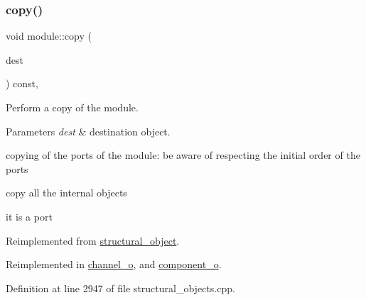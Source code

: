 \subsubsection{\texorpdfstring{copy()}{copy()}}
{\footnotesize\ttfamily void module\+::copy (\begin{DoxyParamCaption}\item[{\hyperlink{structural__objects_8hpp_a8ea5f8cc50ab8f4c31e2751074ff60b2}{structural\+\_\+object\+Ref}}]{dest }\end{DoxyParamCaption}) const\hspace{0.3cm}{\ttfamily [override]}, {\ttfamily [virtual]}}



Perform a copy of the module. 


\begin{DoxyParams}{Parameters}
{\em dest} & destination object. \\
\hline
\end{DoxyParams}
copying of the ports of the module\+: be aware of respecting the initial order of the ports

copy all the internal objects

it is a port 

Reimplemented from \hyperlink{classstructural__object_a6566435c67934f6b4ff1b319c0682b18}{structural\+\_\+object}.



Reimplemented in \hyperlink{classchannel__o_a1e97d51670c7209f2666fdc5431a40a3}{channel\+\_\+o}, and \hyperlink{classcomponent__o_abdd94a898eec3592371908dbe9ade6b4}{component\+\_\+o}.



Definition at line 2947 of file structural\+\_\+objects.\+cpp.



